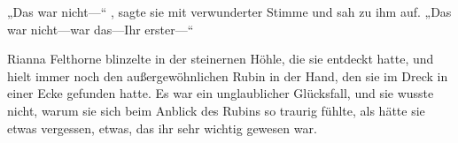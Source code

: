 „Das war nicht—“ , sagte sie mit verwunderter Stimme und sah zu ihm auf. „Das war nicht—war das—Ihr erster—“

Rianna Felthorne blinzelte in der steinernen Höhle, die sie entdeckt hatte, und hielt immer noch den außergewöhnlichen Rubin in der Hand, den sie im Dreck in einer Ecke gefunden hatte. Es war ein unglaublicher Glücksfall, und sie wusste nicht, warum sie sich beim Anblick des Rubins so traurig fühlte, als hätte sie etwas vergessen, etwas, das ihr sehr wichtig gewesen war.

